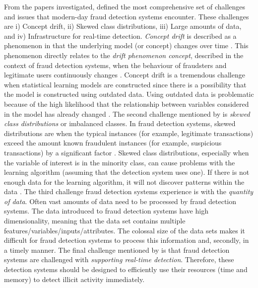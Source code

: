 From the papers investigated, \citet{abdallah2016fraud} defined the most comprehensive set of challenges and issues that modern-day fraud detection systems encounter. These challenges are i) Concept drift, ii) Skewed class distributions, iii) Large amounts of data, and iv) Infrastructure for real-time detection. \textit{Concept drift} is described as a phenomenon in that the underlying model (or concept) changes over time \citep*{abbass2004online}. This phenomenon directly relates to the \textit{drift phenomenon concept}, described in the context of fraud detection systems, when the behaviour of fraudsters and legitimate users continuously changes \citep*{gama2014survey}. Concept drift is a tremendous challenge when statistical learning models are constructed since there is a possibility that the model is constructed using outdated data. Using outdated data is problematic because of the high likelihood that the relationship between variables considered in the model has already changed \citep{gama2014survey}. The second challenge mentioned by \citet{abdallah2016fraud} is \textit{skewed class distributions} or imbalanced classes. In fraud detection systems, skewed distributions are when the typical instances (for example, legitimate transactions) exceed the amount known fraudulent instances (for example, suspicious transactions) by a significant factor \citep*{maes2002credit}. Skewed class distributions, especially when the variable of interest is in the minority class, can cause problems with the learning algorithm (assuming that the detection system uses one). If there is not enough data for the learning algorithm, it will not discover patterns within the data \citep*{abu2012learning}. The third challenge fraud detection systems experience is with the \textit{quantity of data}. Often vast amounts of data need to be processed by fraud detection systems. The data introduced to fraud detection systems have high dimensionality, meaning that the data set contains multiple features/variables/inputs/attributes.  The colossal size of the data sets makes it difficult for fraud detection systems to process this information and, secondly, in a timely manner. The final challenge mentioned by \citet{abdallah2016fraud} is that fraud detection systems are challenged with \textit{supporting real-time detection}. Therefore, these detection systems should be designed to efficiently use their resources (time and memory) to detect illicit activity immediately.

